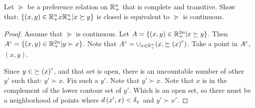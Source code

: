\documentclass[12pt, letterpaper]{paper}
\begin{document}
\begin{question}
  Let $\succeq$ be a preference relation on $\mathbb{R}_+^n$ that is complete and
  transitive. Show that: $\{ (x,y) \in \mathbb{R}_+^n x \mathbb{R}_+^n | x \succeq y \}$
  is closed is equivalent to $\succeq$ is continuous.

  \begin{proof}
    Assume that $\succeq$ is continuous. Let $A = \{ (x,y) \in \mathbb{R}_+^{2n} |
    x \succeq y\}$. Then ${A}^{c} = \{ (x,y) \in \mathbb{R}_+^{2n} | y \succ x
    \}$. Note that ${A}^{c} = \cup_{x \in \mathbb{R}_+^n} ( x, {\succeq(x)}^{c} )$. Take a
    point in ${A}^{c}$, $(x,y)$. 

    Since $y \in {\succeq(x)}^{c}$, and that set is open, there is an
    uncountable number of other $y'$ such that: $y' \succ x$. Fix such a
    $y'$. Note that $y' \succ x$. Note that $x$ is in the complement of
    the lower contour set of $y'$.  Which is an open set, so there
    must be a neighborhood of points where $d \left ( x', x \right ) < \delta_x$ and
    $y' \succ x'$.

    
  \end{proof}
\end{question}
\end{document}
